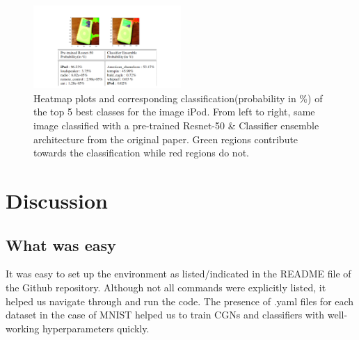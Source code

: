 \begin{figure}[ht!]
\vspace{-4mm}
\centering
    \includegraphics[width=0.5\textwidth]{../openreview/limeplots/ipod_lime_plot.png}
    \caption{Heatmap plots and corresponding classification(probability in \%) of the top 5 best classes for the image iPod. From left to right, same image classified with a pre-trained Resnet-50 \& Classifier ensemble architecture from the original paper\cite{sauer2021counterfactual}. Green regions contribute towards the classification while red regions do not.
    }
    \label{fig:lime_plot}
\end{figure}

\section{Discussion}
\subsection{What was easy}
It was easy to set up the environment as listed/indicated in the README file of the Github repository. Although not all commands were explicitly listed, it helped us navigate through and run the code. The presence of .yaml files for each dataset in the case of MNIST \cite{lecun1998gradient} helped us to train CGNs and classifiers with well-working hyperparameters quickly. 

